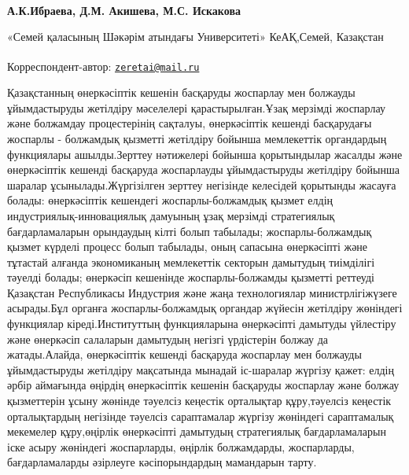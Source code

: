 
\begin{articleheader}

{\bfseries А.К.Ибраева\textsuperscript{\envelope }, Д.М. Акишева, М.С. Искакова}
\end{articleheader}
\begin{affiliation}

«Семей қаласының Шәкәрім атындағы Университеті» КеАҚ,Семей, Казақстан

\raggedright {\bfseries \textsuperscript{\envelope }}Корреспондент-автор: \href{mailto:zeretai@mail.ru}{\nolinkurl{zeretai@mail.ru}}
\end{affiliation}

Қазақстанның өнеркәсіптік кешенін басқаруды жоспарлау мен болжауды
ұйымдастыруды жетілдіру мәселелері қарастырылған.Ұзақ мерзімді жоспарлау
және болжамдау процестерінің сақталуы, өнеркәсіптік кешенді басқарудағы
жоспарлы - болжамдық қызметті жетілдіру бойынша мемлекеттік органдардың
функциялары ашылды.Зерттеу нәтижелері бойынша қорытындылар жасалды және
өнеркәсіптік кешенді басқаруда жоспарлауды ұйымдастыруды жетілдіру
бойынша шаралар ұсынылады.Жүргізілген зерттеу негізінде келесідей
қорытынды жасауға болады: өнеркәсіптік кешендегі жоспарлы-болжамдық
қызмет елдің индустриялық-инновациялық дамуының ұзақ мерзімді
стратегиялық бағдарламаларын орындаудың кілті болып табылады;
жоспарлы-болжамдық қызмет күрделі процесс болып табылады, оның сапасына
өнеркәсіпті және тұтастай алғанда экономиканың мемлекеттік секторын
дамытудың тиімділігі тәуелді болады; өнеркәсіп кешенінде
жоспарлы-болжамды қызметті реттеуді Қазақстан Республикасы Индустрия
және жаңа технологиялар министрлігіжүзеге асырады.Бұл органға
жоспарлы-болжамдық органдар жүйесін жетілдіру жөніндегі функциялар
кіреді.Институттың функцияларына өнеркәсіпті дамытуды үйлестіру және
өнеркәсіп салаларын дамытудың негізгі үрдістерін болжау да
жатады.Алайда, өнеркәсіптік кешенді басқаруда жоспарлау мен болжауды
ұйымдастыруды жетілдіру мақсатында мынадай іс-шаралар жүргізу
қажет: елдің әрбір аймағында өңірдің өнеркәсіптік кешенін басқаруды
жоспарлау және болжау қызметтерін ұсыну жөнінде тәуелсіз кеңестік
орталықтар құру,тәуелсіз кеңестік орталықтардың негізінде тәуелсіз
сараптамалар жүргізу жөніндегі сараптамалық мекемелер құру,өңірлік
өнеркәсіпті дамытудың стратегиялық бағдарламаларын іске асыру жөніндегі
жоспарларды, өңірлік болжамдарды, жоспарларды, бағдарламаларды әзірлеуге
кәсіпорындардың мамандарын тарту.

